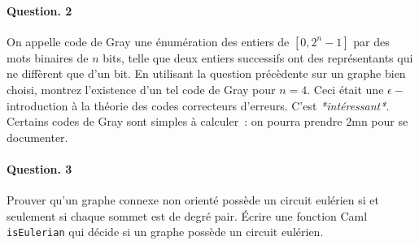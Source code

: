 \documentclass[10pt,a4paper]{article}
\begin{document}
\paragraph{Question. 2\\}
On appelle code de Gray une énumération des entiers de $[0,2^n-1]$ par
des mots binaires de $n$ bits, telle que deux entiers successifs ont des
représentants qui ne diffèrent que d'un bit. En utilisant la question
précèdente sur un graphe bien choisi, montrez l'existence d'un tel code
de Gray pour $n=4$. Ceci était une $\epsilon-$introduction à la théorie
des codes correcteurs d'erreurs. C'est \emph{*intéressant*}. Certains
codes de Gray sont simples à calculer~: on pourra prendre 2mn pour se
documenter.

\paragraph{Question. 3\\} Prouver qu'un graphe connexe non orienté possède un circuit
eulérien si et seulement si chaque sommet est de degré pair. 
Écrire une fonction Caml \texttt{isEulerian} qui décide si un graphe possède un
circuit eulérien. 
\end{document}
